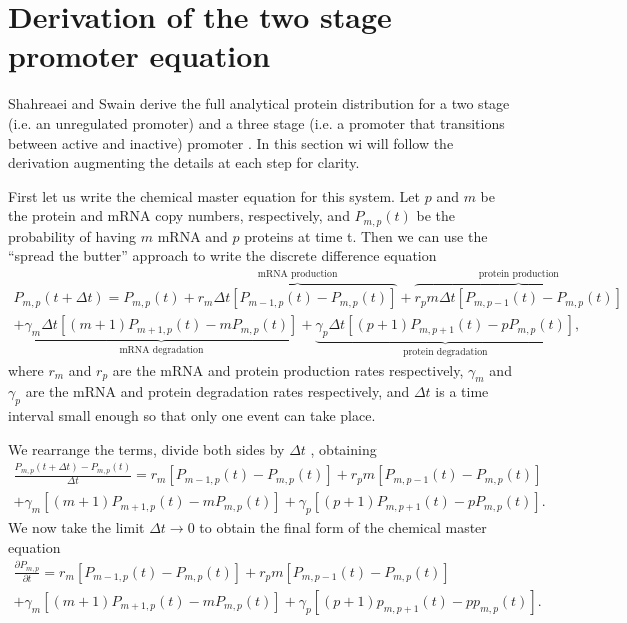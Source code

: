 \section{Derivation of the two stage promoter equation}

Shahreaei and Swain derive the full analytical protein distribution for a two
stage (i.e. an unregulated promoter) and a three stage (i.e. a promoter that
transitions between active and inactive) promoter \cite{Shahrezaei2008}. In
this section wi will follow the derivation augmenting the details at each step
for clarity.

First let us write the chemical master equation for this system. Let $p$ and $m$
be the protein and mRNA copy numbers, respectively, and $P_{m,p}(t)$ be the
probability of having $m$ mRNA and $p$ proteins at time t. Then we can use the
``spread the butter'' approach to write the discrete difference equation
\begin{equation}
\begin{aligned}
P_{m,p}(t + \Delta t) =
P_{m,p}(t)
+ \overbrace{r_m \Delta t \left[ P_{m-1,p}(t) - P_{m,p}(t) \right]}^\text{mRNA
production}
+ \overbrace{r_p m
\Delta t \left[ P_{m, p-1}(t) - P_{m, p}(t) \right]}^\text{protein
production}\\
+ \underbrace{\gamma_m \Delta t \left[ (m + 1) P_{m+1,p}(t) - m P_{m, p}(t)
\right]}_\text{mRNA degradation}
+ \underbrace{\gamma_p \Delta t \left[ (p + 1) P_{m, p+1}(t) - p P_{m, p}(t)
\right]}_\text{protein degradation},
\end{aligned}
\end{equation}
where $r_m$ and $r_p$ are the mRNA and protein production rates respectively,
$\gamma_m$ and $\gamma_p$ are the mRNA and protein degradation rates
respectively, and $\Delta t$ is a time interval small enough so that only one
event can take place.

We rearrange the terms, divide both sides by $\Delta t$ , obtaining
\begin{equation}
  \begin{aligned}
\frac{P_{m,p}(t + \Delta t) - P_{m,p}(t)}{\Delta t} = r_m \left[ P_{m-1,p}(t) -
P_{m,p}(t) \right] + r_p m \left[ P_{m, p-1}(t) - P_{m, p}(t) \right]\\
+ \gamma_m \left[ (m + 1) P_{m+1,p}(t) - m P_{m, p}(t) \right] + \gamma_p \left[
 (p + 1) P_{m, p+1}(t) - p P_{m, p}(t) \right].
  \end{aligned}
\end{equation}
We now take the limit $\Delta t \rightarrow 0$ to obtain the final form of the
chemical master equation
\begin{equation}
\begin{aligned}
\frac{\partial P_{m,p}}{\partial t} = r_m \left[ P_{m-1,p}(t) - P_{m,p}(t)
\right] + r_p m \left[ P_{m, p-1}(t) - P_{m, p}(t) \right]\\
+ \gamma_m \left[ (m + 1) P_{m+1,p}(t) - m P_{m, p}(t) \right] + \gamma_p \left[
(p + 1) p_{m, p+1}(t) - p p_{m, p}(t) \right].
  \end{aligned}
\end{equation}

